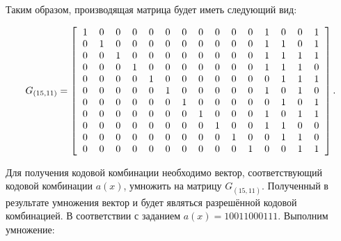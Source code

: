 Таким образом, производящая матрица будет иметь следующий вид:

\begin{equation*}
  G_{(15, 11)} =  \left[
    \begin{tabular}{l*{15}{c}r}
      1 & 0 & 0 & 0 & 0 & 0 & 0 & 0 & 0 & 0 & 0 & 1 & 0 & 0 & 1\\
      0 & 1 & 0 & 0 & 0 & 0 & 0 & 0 & 0 & 0 & 0 & 1 & 1 & 0 & 1\\ 
      0 & 0 & 1 & 0 & 0 & 0 & 0 & 0 & 0 & 0 & 0 & 1 & 1 & 1 & 1\\ 
      0 & 0 & 0 & 1 & 0 & 0 & 0 & 0 & 0 & 0 & 0 & 1 & 1 & 1 & 0\\ 
      0 & 0 & 0 & 0 & 1 & 0 & 0 & 0 & 0 & 0 & 0 & 0 & 1 & 1 & 1\\ 
      0 & 0 & 0 & 0 & 0 & 1 & 0 & 0 & 0 & 0 & 0 & 1 & 0 & 1 & 0\\ 
      0 & 0 & 0 & 0 & 0 & 0 & 1 & 0 & 0 & 0 & 0 & 0 & 1 & 0 & 1\\ 
      0 & 0 & 0 & 0 & 0 & 0 & 0 & 1 & 0 & 0 & 0 & 1 & 0 & 1 & 1\\ 
      0 & 0 & 0 & 0 & 0 & 0 & 0 & 0 & 1 & 0 & 0 & 1 & 1 & 0 & 0\\ 
      0 & 0 & 0 & 0 & 0 & 0 & 0 & 0 & 0 & 1 & 0 & 0 & 1 & 1 & 0\\ 
      0 & 0 & 0 & 0 & 0 & 0 & 0 & 0 & 0 & 0 & 1 & 0 & 0 & 1 & 1
    \end{tabular}
  \right].
\end{equation*}

Для получения кодовой комбинации необходимо вектор, соответствующий
кодовой комбинации $a(x)$, умножить на матрицу $G_{(15,
  11)}$. Полученный в результате умножения вектор и будет являться
разрешённой кодовой комбинацией. В соответствии с заданием
$a(x) = 10011000111$. Выполним умножение:

